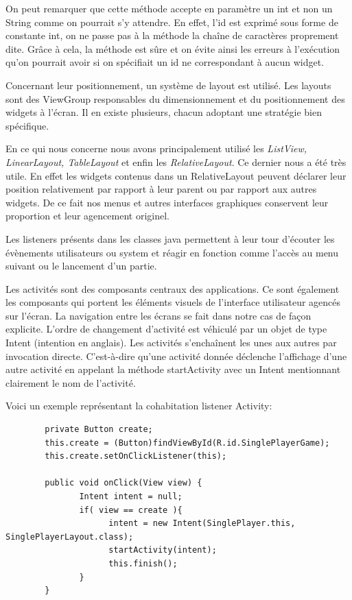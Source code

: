 		On peut remarquer que cette méthode accepte en paramètre un int et non un
		String comme on pourrait s’y attendre. En effet, l’id est exprimé sous forme de constante int, on
		ne passe pas à la méthode la chaîne de caractères proprement dite. Grâce à cela, la
		méthode est sûre et on évite ainsi les erreurs à l’exécution qu’on pourrait avoir si on
		spécifiait un id ne correspondant à aucun widget.
		
		Concernant leur positionnement, un système de layout est utilisé. Les layouts sont des ViewGroup responsables
		du dimensionnement et du positionnement des widgets à l’écran. Il en existe plusieurs, 
		chacun adoptant une stratégie bien spécifique. 
		
		En ce qui nous concerne nous avons principalement utilisé les
		\textit{ListView, LinearLayout, TableLayout} et enfin les \textit{RelativeLayout}. Ce dernier nous a été très utile. En
		effet les widgets contenus dans un RelativeLayout peuvent déclarer leur position relativement
		par rapport à leur parent ou par rapport aux autres widgets. De ce fait nos
		menus et autres interfaces graphiques conservent leur proportion et leur
		agencement originel.		
		
		
		Les listeners présents dans	les classes java permettent à leur tour d'écouter les évènements utilisateurs
		ou system et réagir en fonction comme l'accès au menu suivant ou le lancement
		d'un partie. 
		
		
		Les activités sont des composants centraux des applications. Ce sont également les
		composants qui portent les éléments visuels de l’interface utilisateur agencés
		sur l’écran. La navigation entre les écrans se fait dans notre cas de façon
		explicite. L’ordre de changement d’activité est véhiculé par un objet de type Intent (intention en anglais).
		Les activités s’enchaînent les unes aux autres par invocation directe.
		C’est-à-dire qu’une activité donnée déclenche l’affichage d’une autre activité 
		en appelant la méthode startActivity avec un Intent mentionnant clairement le nom
		de l’activité. 
		
		Voici un exemple représentant la cohabitation listener Activity:
		
		\begin{verbatim}
		private Button create;
		this.create = (Button)findViewById(R.id.SinglePlayerGame);
		this.create.setOnClickListener(this);
			
		public void onClick(View view) {
		       Intent intent = null;
		       if( view == create ){
		             intent = new Intent(SinglePlayer.this, SinglePlayerLayout.class);
		             startActivity(intent);
		             this.finish();
		       }
		}
		\end{verbatim}
		
